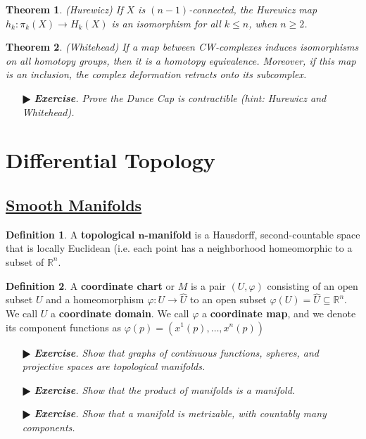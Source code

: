 \documentclass[11pt]{amsart}
\newtheorem*{theorem*}{Theorem}
\theoremstyle{definition}
\newtheorem*{definition*}{Definition}
\renewcommand\geq{\geqslant}
\renewcommand\leq{\leqslant}
\renewcommand\hat{\widehat}
\renewcommand\:{\colon}
\newcommand{\R}{\mathds{R}}
\newcommand{\1}{\mathds{1}}
\newcommand{\exc}[1]{\vspace{-2.5pt}\begin{itemize}[leftmargin=15pt]\item[$\RHD$] \textit{\textbf{Exercise}. #1}\end{itemize}}
\begin{document}
\begin{theorem*}
	\textnormal{(Hurewicz)} If $X$ is $(n-1)$-connected, the Hurewicz map $h_k\: \pi_k(X) \to H_k(X)$ is an isomorphism for all $k \leq n$, when $n \geq 2$.
\end{theorem*}

\begin{theorem*}
	\textnormal{(Whitehead)} If a map between CW-complexes induces isomorphisms on all homotopy groups, then it is a homotopy equivalence. Moreover, if this map is an inclusion, the complex deformation retracts onto its subcomplex. 
\end{theorem*}

\exc{Prove the Dunce Cap is contractible (hint: Hurewicz and Whitehead).}

\vskip40pt







\section*{Differential Topology}

\subsection*{\underline{Smooth Manifolds}}

\begin{definition*}
	A \textbf{topological $\boldsymbol{n}$-manifold} is a Hausdorff, second-countable space that is locally Euclidean (i.e. each point has a neighborhood homeomorphic to a subset of $\R^n$. 
\end{definition*}

\begin{definition*}
	A \textbf{coordinate chart} or $M$ is a pair $(U, \varphi)$ consisting of an open subset $U$ and a homeomorphism $\varphi\: U \to \hat U$ to an open subset $\varphi(U) = \hat U \subseteq \R^n$. We call $U$ a \textbf{coordinate domain}. We call $\varphi$ a \textbf{coordinate map}, and we denote its component functions as $\varphi(p) = (x^1(p), \dots, x^n(p))$
\end{definition*}

\exc{Show that graphs of continuous functions, spheres, and projective spaces are topological manifolds.}
\exc{Show that the product of manifolds is a manifold.}
\exc{Show that a manifold is metrizable, with countably many components.}
\end{document}
